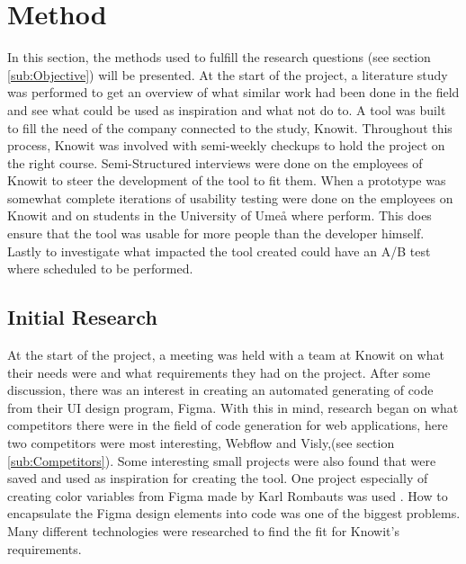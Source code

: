 \section{Method}

In this section, the methods used to fulfill the research questions (see section \ref{sub:Objective}) will be presented. At the start of the project, a literature study was performed to get an overview of what similar work had been done in the field and see what could be used as inspiration and what not do to. A tool was built to fill the need of the company connected to the study, Knowit. Throughout this process, Knowit was involved with semi-weekly checkups to hold the project on the right course. Semi-Structured interviews were done on the employees of Knowit to steer the development of the tool to fit them. When a prototype was somewhat complete iterations of usability testing were done on the employees on Knowit and on students in the University of Umeå where perform. This does ensure that the tool was usable for more people than the developer himself. Lastly to investigate what impacted the tool created could have an A/B test where scheduled to be performed.

\subsection{Initial Research}%
\label{sub:Initial Research}

At the start of the project, a meeting was held with a team at Knowit on what their needs were and what requirements they had on the project. After some discussion, there was an interest in creating an automated generating of code from their UI design program, Figma. With this in mind, research began on what competitors there were in the field of code generation for web applications, here two competitors were most interesting, Webflow and Visly,(see section \ref{sub:Competitors}). Some interesting small projects were also found that were saved and used as inspiration for creating the tool. One project especially of creating color variables from Figma made by Karl Rombauts was used \cite{rombautsKarlRombautsFigmaSCSSGenerator2021}. How to encapsulate the Figma design elements into code was one of the biggest problems. Many different technologies were researched to find the fit for Knowit's requirements.


